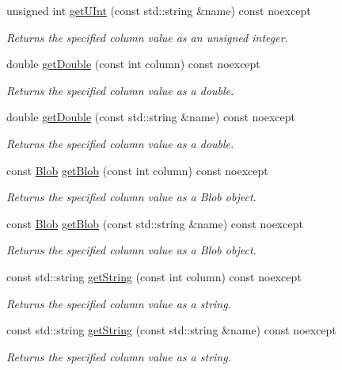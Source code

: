 \begin{DoxyCompactItemize}
unsigned int \hyperlink{a00010_a18315a8379249158c3f827441e8f6de0}{get\-U\-Int} (const std\-::string \&name) const noexcept
\begin{DoxyCompactList}\small\item\em Returns the specified column value as an unsigned integer. \end{DoxyCompactList}\item 
double \hyperlink{a00010_a679e56078c78e01c99fa08ad0b7ee782}{get\-Double} (const int column) const noexcept
\begin{DoxyCompactList}\small\item\em Returns the specified column value as a double. \end{DoxyCompactList}\item 
double \hyperlink{a00010_a45e9dd813439e8cda7608e18c1ccce5f}{get\-Double} (const std\-::string \&name) const noexcept
\begin{DoxyCompactList}\small\item\em Returns the specified column value as a double. \end{DoxyCompactList}\item 
const \hyperlink{a00002}{Blob} \hyperlink{a00010_a80028dc9f221648fe2398b40bd380c31}{get\-Blob} (const int column) const noexcept
\begin{DoxyCompactList}\small\item\em Returns the specified column value as a Blob object. \end{DoxyCompactList}\item 
const \hyperlink{a00002}{Blob} \hyperlink{a00010_a4e50d9ec365c547b5edb7d062aeba72b}{get\-Blob} (const std\-::string \&name) const noexcept
\begin{DoxyCompactList}\small\item\em Returns the specified column value as a Blob object. \end{DoxyCompactList}\item 
const std\-::string \hyperlink{a00010_a0920d021f6962f75e7b555e3f20fc0fc}{get\-String} (const int column) const noexcept
\begin{DoxyCompactList}\small\item\em Returns the specified column value as a string. \end{DoxyCompactList}\item 
const std\-::string \hyperlink{a00010_a44f9f5da46aa91b869fe26a188e803fa}{get\-String} (const std\-::string \&name) const noexcept
\begin{DoxyCompactList}\small\item\em Returns the specified column value as a string. \end{DoxyCompactList}\item 

\end{DoxyCompactItemize}
